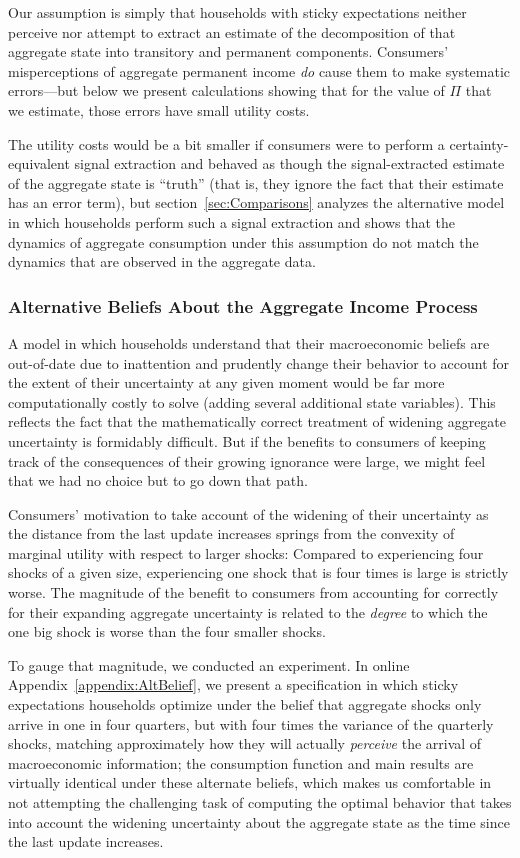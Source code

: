 \documentclass[titlepage]{./econtex}
\begin{document}
Our assumption is simply that households with sticky expectations neither perceive nor attempt to extract an estimate of the decomposition of that aggregate state into transitory and permanent components.  Consumers' misperceptions of aggregate permanent income \textit{do} cause them to make systematic errors---but below we present calculations showing that for the value of $\Pi$ that we estimate, those errors have small utility costs.

The utility costs would be a bit smaller if consumers were to perform a certainty-equivalent signal extraction and behaved as though the signal-extracted estimate of the aggregate state is ``truth'' (that is, they ignore the fact that their estimate has an error term), but section~\ref{sec:Comparisons} analyzes the alternative model in which households perform such a signal extraction and shows that the dynamics of aggregate consumption under this assumption do not match the dynamics that are observed in the aggregate data.

\subsubsection{Alternative Beliefs About the Aggregate Income Process}
A model in which households understand that their macroeconomic beliefs are out-of-date due to inattention and prudently change their behavior to account for the extent of their uncertainty at any given moment would be far more computationally costly to solve (adding several additional state variables).  This reflects the fact that the mathematically correct treatment of widening aggregate uncertainty is formidably difficult.  But if the benefits to consumers of keeping track of the consequences of their growing ignorance were large, we might feel that we had no choice but to go down that path.

Consumers' motivation to take account of the widening of their uncertainty as the distance from the last update increases springs from the convexity of marginal utility with respect to larger shocks: Compared to experiencing four shocks of a given size, experiencing one shock that is four times is large is strictly worse.  The magnitude of the benefit to consumers from accounting for correctly for their expanding aggregate uncertainty is related to the \textit{degree} to which the one big shock is worse than the four smaller shocks.

To gauge that magnitude, we conducted an experiment.  In online Appendix~\ref{appendix:AltBelief}, we present a specification in which sticky expectations households optimize under the belief that aggregate shocks only arrive in one in four quarters, but with four times the variance of the quarterly shocks, matching approximately how they will actually \textit{perceive} the arrival of macroeconomic information; the consumption function and main results are virtually identical under these alternate beliefs, which makes us comfortable in not attempting the challenging task of computing the optimal behavior that takes into account the widening uncertainty about the aggregate state as the time since the last update increases.
\end{document}
